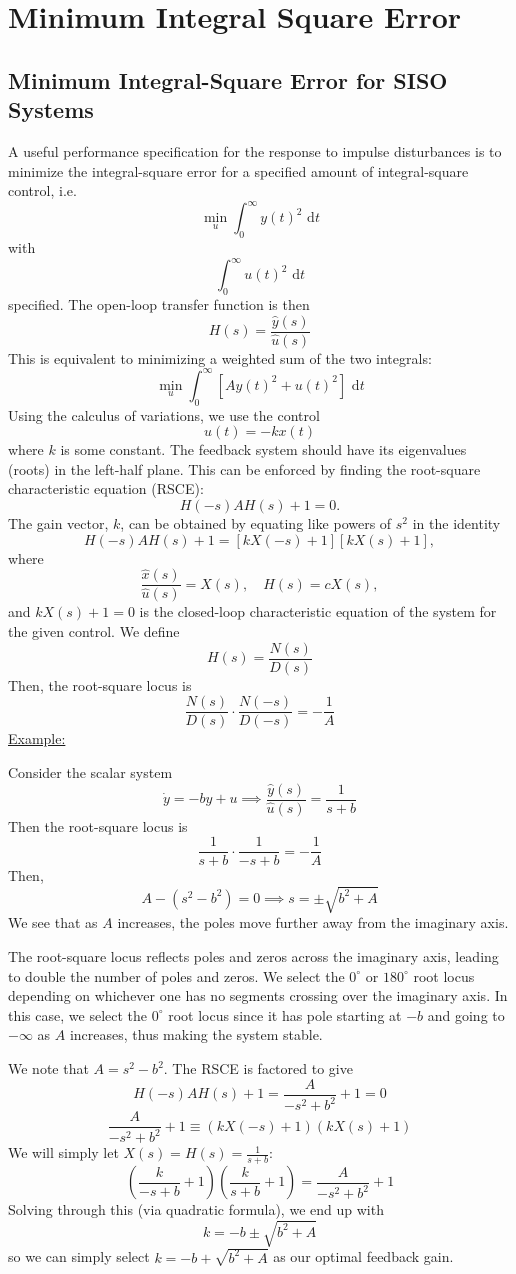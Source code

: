 \documentclass{article}
\begin{document}
\section{Minimum Integral Square Error}

\subsection{Minimum Integral-Square Error for SISO Systems}

A useful performance specification for the response to impulse disturbances
is to minimize the integral-square error for a specified amount of integral-square control, i.e.
\[\min_{u}\int_{0}^{\infty}y(t)^2\text{ d}t\]
with
\[\int_{0}^{\infty}u(t)^2\text{ d}t\]
specified. The open-loop transfer function is then
\[H(s) = \frac{\hat{y}(s)}{\hat{u}(s)}\]
This is equivalent to minimizing a weighted sum of the two integrals:
\[\min_{u}\int_{0}^{\infty}[Ay(t)^2+u(t)^2]\text{ d}t\]
Using the calculus of variations, we use the control
\[u(t) = -kx(t)\]
where $k$ is some constant. The feedback system should have its eigenvalues (roots)
in the left-half plane. This can be enforced by finding the root-square characteristic
equation (RSCE):
\[H(-s)AH(s) + 1 = 0.\]
The gain vector, $k$, can be obtained by equating like powers of $s^2$ in the identity
\[H(-s)AH(s) + 1 = [kX(-s)+1][kX(s)+1],\]
where
\[\frac{\hat{x}(s)}{\hat{u}(s)} = X(s), \quad H(s) = cX(s),\]
and $kX(s)+1=0$ is the closed-loop characteristic equation of the system for the given control.
We define
\[H(s) = \frac{N(s)}{D(s)}\]
Then, the root-square locus is
\[\frac{N(s)}{D(s)}\cdot\frac{N(-s)}{D(-s)} = -\frac{1}{A}\]
\underline{Example:}

\noindent
Consider the scalar system
\[\dot{y} = -by + u \implies \frac{\hat{y}(s)}{\hat{u}(s)} = \frac{1}{s+b}\]
Then the root-square locus is
\[\frac{1}{s+b}\cdot\frac{1}{-s+b} = -\frac{1}{A}\]
Then,
\[A - (s^2-b^2) = 0 \implies s = \pm\sqrt{b^2+A}\]
We see that as $A$ increases, the poles move further away from the imaginary axis.

\noindent
The root-square locus reflects poles and zeros across the imaginary axis, leading
to double the number of poles and zeros. We select the $0^\circ$ or $180^\circ$
root locus depending on whichever one has no segments crossing over the imaginary axis.
In this case, we select the $0^\circ$ root locus since it has pole starting at $-b$
and going to $-\infty$ as $A$ increases, thus making the system stable.

\noindent
We note that $A = s^2 - b^2$. The RSCE is factored to give
\[H(-s)AH(s) + 1 = \frac{A}{-s^2+b^2} + 1 = 0\]
\[\frac{A}{-s^2+b^2} + 1 \equiv \left(kX(-s) + 1\right)\left(kX(s) + 1\right)\]
We will simply let $X(s) = H(s) = \frac{1}{s+b}$:
\[\left(\frac{k}{-s+b}+1\right)\left(\frac{k}{s+b}+1\right) = \frac{A}{-s^2+b^2} + 1\]
Solving through this (via quadratic formula), we end up with
\[k = -b \pm \sqrt{b^2+A}\]
so we can simply select $k = -b + \sqrt{b^2+A}$ as our optimal feedback gain.
\end{document}
